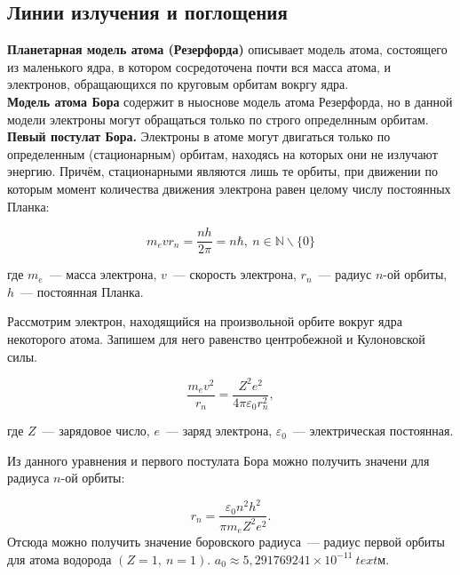 \subsection{Линии излучения и поглощения}

\textbf{Планетарная модель атома (Резерфорда)} описывает модель атома, состоящего из маленького ядра, в котором сосредоточена почти вся масса атома, и электронов, обращающихся по круговым орбитам вокргу ядра. \\

\textbf{Модель атома Бора} содержит в ныоснове модель атома Резерфорда, но в данной модели электроны могут обращаться только по строго определнным орбитам.\\

\textbf{Певый постулат Бора.} Электроны в атоме могут двигаться только по определенным (стационарным) орбитам, находясь на которых они не излучают энергию.  Причём, стационарными являются лишь те орбиты, при движении по которым момент количества движения электрона равен целому числу постоянных Планка:

\begin{equation}
	m_e v r_n = \frac{n h}{2 \pi} = n \hbar,~n \in \mathbb{N} \backslash \lbrace 0 \rbrace
\end{equation}

где $m_e$~--- масса электрона, $v$~--- скорость электрона, $r_n$~--- радиус $n$-ой орбиты, $h$~--- постоянная Планка.

Рассмотрим электрон, находящийся на произвольной орбите вокруг ядра некоторого атома. Запишем для него равенство центробежной и Кулоновской силы.

\begin{equation}
	\frac{m_e v^2}{r_n} = \frac{Z^2 e^2}{4 \pi \varepsilon_0 r_n^2},
\end{equation}

где $Z$~--- зарядовое число, $e$~--- заряд электрона, $\varepsilon_0$~--- электрическая постоянная.

Из данного уравнения и первого постулата Бора можно получить значени для радиуса $n$-ой орбиты:

\begin{equation}
	r_n = \frac{\varepsilon_0 n^2 h^2}{\pi m_e Z^2 e^2}.
\end{equation}
Отсюда можно получить значение боровского радиуса~--- радиус первой орбиты для атома водорода $(Z = 1,~n = 1)$. $a_0 \approx 5,291769241 \times 10^{-11}~text{м}$. \\

